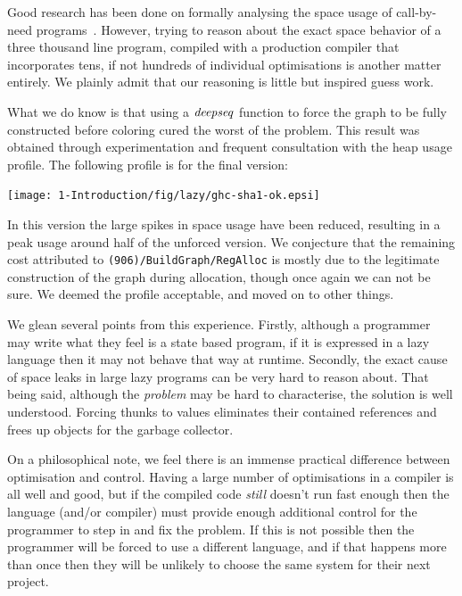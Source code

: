 Good research has been done on formally analysing the space usage of call-by-need programs~\cite{gustavsson:space-improvement, bakewell:space-usage}. However, trying to reason about the exact space behavior of a three thousand line program, compiled with a production compiler that incorporates tens, if not hundreds of individual optimisations is another matter entirely. We plainly admit that our reasoning is little but inspired guess work.

What we do know is that using a $\operatorname{\mathit{deepseq}}$ function to force the graph to be fully constructed before coloring cured the worst of the problem. This result was obtained through experimentation and frequent consultation with the heap usage profile. The following profile is for the final version:

\begin{center}
\texttt{[image: 1-Introduction/fig/lazy/ghc-sha1-ok.epsi]}
\end{center}

In this version the large spikes in space usage have been reduced, resulting in a peak usage around half of the unforced version. We conjecture that the remaining cost attributed to \texttt{(906)/BuildGraph/RegAlloc} is mostly due to the legitimate construction of the graph during allocation, though once again we can not be sure. We deemed the profile acceptable, and moved on to other things.

We glean several points from this experience. Firstly, although a programmer may write what they feel is a state based program, if it is expressed in a lazy language then it may not behave that way at runtime. Secondly, the exact cause of space leaks in large lazy programs can be very hard to reason about. That being said, although the \emph{problem} may be hard to characterise, the solution is well understood. Forcing thunks to values eliminates their contained references and frees up objects for the garbage collector. 

On a philosophical note, we feel there is an immense practical difference between optimisation and control. Having a large number of optimisations in a compiler is all well and good, but if the compiled code \emph{still} doesn't run fast enough then the language (and/or compiler) must provide enough additional control for the programmer to step in and fix the problem. If this is not possible then the programmer will be forced to use a different language, and if that happens more than once then they will be unlikely to choose the same system for their next project.

